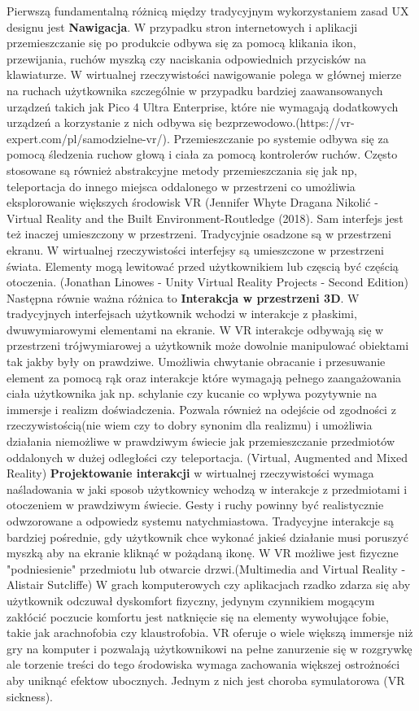 Pierwszą fundamentalną różnicą między tradycyjnym wykorzystaniem zasad UX designu jest \textbf{Nawigacja}. W przypadku stron internetowych i aplikacji przemieszczanie się po produkcie odbywa się za pomocą klikania ikon, przewijania, ruchów myszką czy naciskania odpowiednich przycisków na klawiaturze. W wirtualnej rzeczywistości nawigowanie polega w głównej mierze na ruchach użytkownika szczególnie w przypadku bardziej zaawansowanych urządzeń takich jak  Pico 4 Ultra Enterprise, które nie wymagają dodatkowych urządzeń a korzystanie z nich odbywa się bezprzewodowo.(https://vr-expert.com/pl/samodzielne-vr/). Przemieszczanie po systemie odbywa się za pomocą śledzenia ruchow głową i ciała za pomocą kontrolerów ruchów. Często stosowane są również abstrakcyjne metody przemieszczania się jak np, teleportacja do innego miejsca oddalonego w przestrzeni co umożliwia eksplorowanie większych środowisk VR (Jennifer Whyte Dragana Nikolić - Virtual Reality and the Built Environment-Routledge (2018). Sam interfejs jest też inaczej umieszczony w przestrzeni. Tradycyjnie osadzone są w przestrzeni ekranu. W wirtualnej rzeczywistości interfejsy są umieszczone w przestrzeni  świata. Elementy mogą lewitować przed użytkownikiem lub częscią być częścią otoczenia. (Jonathan Linowes - Unity Virtual Reality Projects - Second Edition)
Następna równie ważna różnica to \textbf{Interakcja w przestrzeni 3D}. W tradycyjnych interfejsach  użytkownik wchodzi w interakcje z płaskimi, dwuwymiarowymi elementami na ekranie. W VR interakcje odbywają się w przestrzeni trójwymiarowej a użytkownik może dowolnie manipulować  obiektami tak jakby były on prawdziwe. Umożliwia chwytanie obracanie i przesuwanie element za pomocą rąk oraz interakcje które wymagają pełnego zaangażowania ciała użytkownika jak np. schylanie czy kucanie co wpływa pozytywnie na immersje i realizm doświadczenia.
Pozwala również na odejście od zgodności z rzeczywistością(nie wiem czy  to dobry synonim dla realizmu) i umożliwia działania niemożliwe w prawdziwym świecie jak przemieszczanie przedmiotów oddalonych w dużej odległości czy teleportacja. (Virtual, Augmented and Mixed Reality)
\textbf{Projektowanie interakcji} w wirtualnej rzeczywistości wymaga naśladowania w jaki sposob użytkownicy wchodzą w interakcje z przedmiotami i otoczeniem w prawdziwym świecie. Gesty i ruchy powinny być realistycznie odwzorowane a odpowiedz systemu natychmiastowa. Tradycyjne interakcje są bardziej pośrednie, gdy użytkownik chce wykonać jakieś działanie musi poruszyć myszką aby na ekranie kliknąć w pożądaną ikonę. W VR możliwe jest fizyczne "podniesienie" przedmiotu lub otwarcie drzwi.(Multimedia and Virtual Reality - Alistair Sutcliffe)    
W grach komputerowych czy aplikacjach rzadko zdarza się aby użytkownik odczuwał dyskomfort fizyczny, jedynym czynnikiem mogącym zakłócić poczucie komfortu jest natknięcie się na elementy wywołujące fobie, takie jak arachnofobia czy klaustrofobia. VR oferuje o wiele większą immersje niż gry na komputer i pozwalają użytkownikowi na pełne zanurzenie się w rozgrywkę ale torzenie treści do tego środowiska wymaga zachowania większej ostrożności aby uniknąć efektow ubocznych. Jednym z nich jest choroba symulatorowa (VR sickness).


